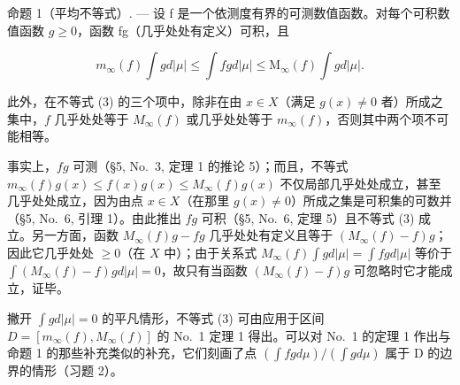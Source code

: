 命题 1（平均不等式）. --- 设 f 是一个依测度有界的可测数值函数。对每个可积数值函数 \(g \geqslant 0\)，函数 fg（几乎处处有定义）可积，且

\[
m _ {\infty} (f) \int g d | \mu | \leqslant \int f g d | \mu | \leqslant \mathrm{M} _ {\infty} (f) \int g d | \mu |.\tag{3}
\]

此外，在不等式 (3) 的三个项中，除非在由 \(x \in X\)（满足 \(g(x) \neq 0\) 者）所成之集中，\(f\) 几乎处处等于 \(M_{\infty}(f)\) 或几乎处处等于 \(m_{\infty}(f)\)，否则其中两个项不可能相等。

事实上，\(fg\) 可测（§5, No.~3, 定理 1 的推论 5）；而且，不等式 \(m_{\infty}(f)g(x) \leqslant f(x)g(x) \leqslant M_{\infty}(f)g(x)\) 不仅局部几乎处处成立，甚至几乎处处成立，因为由点 \(x \in X\)（在那里 \(g(x) \neq 0\)）所成之集是可积集的可数并（§5, No.~6, 引理 1）。由此推出 \(fg\) 可积（§5, No.~6, 定理 5）且不等式 (3) 成立。另一方面，函数 \(M_{\infty}(f)g - fg\) 几乎处处有定义且等于 \((M_{\infty}(f) - f)g\)；因此它几乎处处 \(\geqslant 0\)（在 \(X\) 中）；由于关系式 \(M_{\infty}(f) \int g d|\mu| = \int fg d|\mu|\) 等价于 \(\int(M_{\infty}(f) - f)gd|\mu| = 0\)，故只有当函数 \((M_{\infty}(f) - f)g\) 可忽略时它才能成立，证毕。

撇开 \(\int g d|\mu| = 0\) 的平凡情形，不等式 (3) 可由应用于区间 \(D = [m_{\infty}(f), M_{\infty}(f)]\) 的 No.~1 定理 1 得出。可以对 No.~1 的定理 1 作出与命题 1 的那些补充类似的补充，它们刻画了点 \((\int f g d\mu)/(\int g d\mu)\) 属于 D 的边界的情形（习题 2）。

